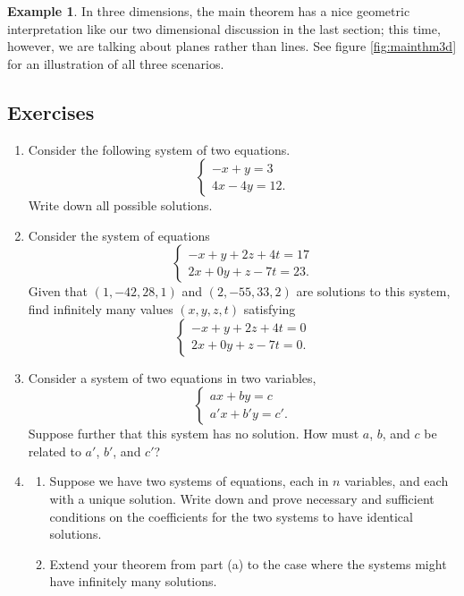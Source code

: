 \documentclass[a4paper,leqno]{article}
\numberwithin{equation}{section}
\theoremstyle{definition}
\newtheorem{ex}[equation]{Example}
\theoremstyle{remark}
\begin{document}
\begin{ex}
  In three dimensions, the main theorem has a nice geometric interpretation like our two dimensional discussion in the last section;
  this time, however, we are talking about planes rather than lines. See figure \ref{fig:mainthm3d} for an illustration of all three
  scenarios.
\end{ex}

\subsection*{Exercises}
\begin{enumerate}
  \item Consider the following system of two equations.
        \begin{equation*}
          \begin{cases}
            - x + y = 3\\
            4x - 4y = 12.
          \end{cases}
        \end{equation*}
        Write down all possible solutions.
  \item Consider the system of equations
        \begin{equation*}
          \begin{cases}
            -x + y + 2z + 4t = 17\\
            2x + 0y + z - 7t = 23.
          \end{cases}
        \end{equation*}
        Given that $ (1,-42,28,1) $ and $ (2, -55, 33, 2) $ are solutions to this system, find infinitely many values $ (x,y,z,t) $ satisfying
        \begin{equation*}
          \begin{cases}
            -x + y + 2z + 4t = 0\\
            2x + 0y + z - 7t = 0.
          \end{cases}
        \end{equation*}
  \item Consider a system of two equations in two variables,
        \begin{equation*}
          \begin{cases}
            ax + by = c\\
            a'x + b'y = c'.
          \end{cases}
        \end{equation*}
        Suppose further that this system has no solution. How must $ a $, $ b $, and $ c $ be related to $ a' $, $ b' $, and $ c' $?
  \item
    \begin{enumerate}
      \item Suppose we have two systems of equations, each in $ n $ variables, and each with a unique solution. Write down and prove
            necessary and sufficient conditions on the coefficients for the two systems to have identical solutions.
      \item Extend your theorem from part (a) to the case where the systems might have infinitely many solutions.
    \end{enumerate}
\end{enumerate}
\end{document}
